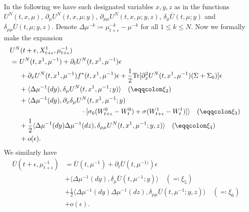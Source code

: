 \documentclass{amsart}
\theoremstyle{definition}
\theoremstyle{remark}
\numberwithin{equation}{section}
\begin{document}
In the following we have such designated variables $x,y,z$ as in the functions
$U^N(t,x,\mu)$, $\partial_\mu U^N(t, x, \mu; y) $,
$\partial_{\mu\mu} U^N(t, x, \mu; y,z)$, $\delta_\mu\overline U(t,\mu; y)$ and
$ \delta_{\mu\mu} \overline U(t, \mu; y,z) $.
Denote $\Delta \mu^{-k}\coloneqq \mu_{t+\epsilon}^{-k}- \mu^{-k} $ for all $1\le k\le N $.
Now we  formally make the expansion
\begin{align*}
&\hskip -0.5cm  U^N(t+\epsilon, X_{t+\epsilon}^1, \mu^{-1}_{t+\epsilon})\\
=\ &
U^N(t, x^1, \mu^{-1}) + \partial_t U^N(t, x^1, \mu^{-1}) \epsilon \\
& + \partial_x U^N(t,x^1, \mu^{-1})f^*(t, x^1, \mu^{-1}) \epsilon  + \frac12 \mbox{Tr}[ \partial_x^2 U^N(t, x^1, \mu^{-1}) (\Sigma+\Sigma_0)] \epsilon \\
&+ \langle \Delta\mu^{-1} (dy), \delta_\mu U^N(t, x^1, \mu^{-1}; y)     \rangle \quad ( \eqqcolon \xi_2) \\
& +\langle \Delta\mu^{-1} (dy),  \partial_x\delta_\mu  U^N(t, x^1, \mu^{-1}; y)\\
 & \hskip 3.2cm  \cdot[\sigma_0 (W_{t+\epsilon }^0-W_t^0)+\sigma(W^1_{t+\epsilon}-W^1_t)]    \rangle
 \quad (\eqqcolon \xi_3)    \\
&+\frac12 \langle \Delta\mu^{-1} (dy)\Delta\mu^{-1} (dz),  \delta_{\mu\mu} U^N(t, x^1, \mu^{-1}; y,z)
\rangle \quad (\eqqcolon \xi_4) \\
&+o(\epsilon).
\end{align*}
We similarly have
\begin{align*}
 \overline U (t+\epsilon, \mu^{-1}_{t+\epsilon})& =
 \overline U(t, \mu^{-1}) +\partial_t  \overline U (t, \mu^{-1)})\epsilon  \\
 & +
\langle \Delta\mu^{-1}(dy), \delta_\mu
\overline U (t, \mu^{-1};y)  \rangle \quad (\eqqcolon\xi_5)  \\
&+\frac12
\langle \Delta\mu^{-1} (dy)\Delta\mu^{-1} (dz) , \delta_{\mu\mu} \overline U (t,\mu^{-1};y,z ) \rangle \quad (\eqqcolon\xi_6) \\
& +o(\epsilon).
\end{align*}
\end{document}

